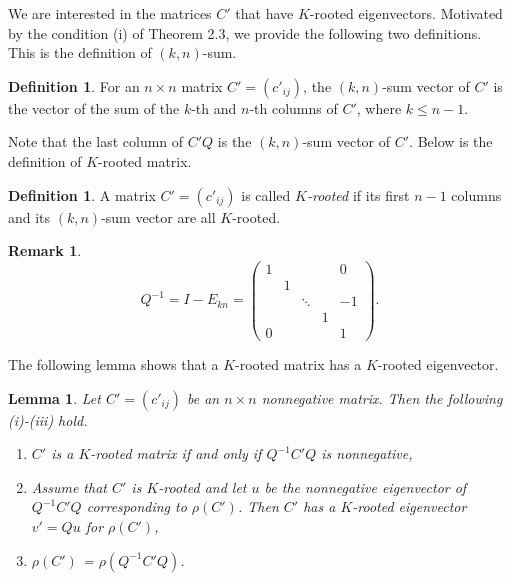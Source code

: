 \documentclass[12pt, a4paper]{article}
\theoremstyle{plain}
\newtheorem{lem}[thm]{Lemma}
\theoremstyle{definition}
\newtheorem{defn}[thm]{Definition}
\newtheorem{rem}[thm]{Remark}
\begin{document}
We are interested in the matrices $C'$ that have $K$-rooted eigenvectors.
Motivated by the condition (i) of Theorem 2.3, we provide the following two definitions.
This is the definition of $(k,n)$-sum.
\begin{defn}
    For an $n \times n$ matrix $C'=(c'_{ij})$, the $(k, n)$-sum vector of $C'$ is the vector of the sum of the $k$-th and  $n$-th columns of $C'$, where $k\leq n-1$.
\end{defn}

Note that the last column of $C'Q$ is the $(k, n)$-sum vector of $C'$.
Below is the definition of $K$-rooted matrix.
\begin{defn}\label{m_rooted}
    A  matrix $C'=(c'_{ij})$ is called {\it $K$-rooted} if its first $n-1$ columns and its $(k,n)$-sum vector are all $K$-rooted.
\end{defn}


\begin{rem}

    $$Q^{-1}=I-E_{kn}=\begin{pmatrix}
    1 &  & &   & 0 \\
    & 1 &        &  &  \\
    &  & \ddots  &  & -1 \\
    &  & &  1 &  \\
    0 &  &  &  & 1
    \end{pmatrix}.$$

\end{rem}

The following lemma shows that a $K$-rooted matrix has a $K$-rooted eigenvector.
\begin{lem}\label{lma_m_rooted}
    Let $C'=(c'_{ij})$ be an $n\times n$ nonnegative matrix. Then the following (i)-(iii) hold.
        \begin{enumerate}[label=(\roman*)]
            \item \label{lma_m_rooted_cond1} $C'$ is a $K$-rooted matrix if and only if $Q^{-1}C'Q$ is nonnegative,
            \item \label{lma_m_rooted_cond2}Assume that $C'$ is $K$-rooted and let $u$ be the nonnegative eigenvector of $Q^{-1}C'Q$
                corresponding to $\rho(C')$. Then  $C'$ has a $K$-rooted eigenvector $v'=Qu$ for $\rho(C')$,
            \item \label{lma_m_rooted_cond3}$\rho(C')$ = $\rho(Q^{-1}C'Q)$.
        \end{enumerate}
\end{lem}
\end{document}
